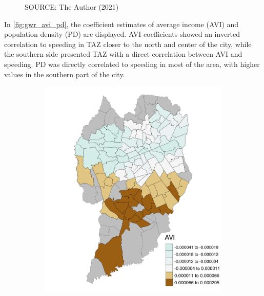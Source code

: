 \begin{figure}[!htbp]
\begin{subfigure}{0.5\textwidth}
    \end{subfigure}    
    \label{fig:gwr_dis_dcsu}
    \par SOURCE: The Author (2021)
\end{figure}


In \autoref{fig:gwr_avi_pd}, the coefficient estimates of average income (AVI) and population density (PD) are displayed. AVI coefficients showed an inverted correlation to speeding in TAZ closer to the north and center of the city, while the southern side presented TAZ with a direct correlation between AVI and speeding. PD was directly correlated to speeding in most of the area, with higher values in the southern part of the city. 

\begin{figure}[!htbp]
    \centering\footnotesize
    \captionsetup{font=footnotesize}
    \caption{AVI AND PD COEFFICIENT ESTIMATES}
    \begin{subfigure}{0.5\textwidth}
        \includegraphics{fig/AVI.png}
    \end{subfigure}%
    \begin{subfigure}{0.5\textwidth}

\end{subfigure}
\end{figure}
